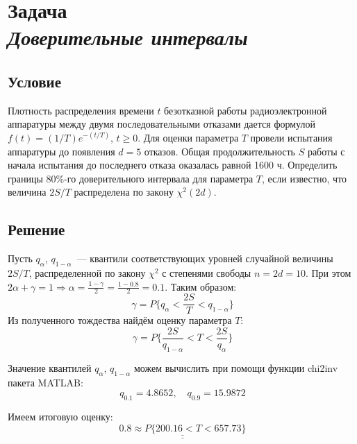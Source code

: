 \section*{Задача \\\textit{Доверительные интервалы}}

\subsection*{Условие}
\sloppy Плотность распределения времени $t$ безотказной работы радиоэлектронной аппаратуры между двумя последовательными отказами дается формулой $f(t) = (1/T)e^{-(t/T)}$, $t \geqslant 0$. Для оценки параметра $T$ провели испытания аппаратуры до появления $d = 5$ отказов. Общая продолжительность $S$ работы с начала испытания до последнего отказа оказалась равной 1600 ч. Определить границы 80\%-го доверительного интервала для параметра $T$, если известно, что величина $2S/T$ распределена по закону $\chi^2(2d)$.

\subsection*{Решение}
Пусть $q_{\alpha}$, $q_{1 - \alpha}$~--- квантили соответствующих уровней случайной величины $2S/T$, распределенной по закону $\chi^2$ с степенями свободы $n = 2d = 10$. При этом $2\alpha + \gamma = 1 \Rightarrow \alpha = \frac{1 - \gamma}{2} = \frac{1 - 0.8}{2} = 0.1$. Таким образом:
\begin{equation*}
    \gamma = P\Big\{q_{\alpha} < \frac{2S}{T} < q_{1 - \alpha}\Big\}
\end{equation*}
Из полученного тождества найдём оценку параметра $T$:
\begin{equation*}
    \gamma = P\Big\{\frac{2S}{q_{1 - \alpha}} < T < \frac{2S}{q_{\alpha}}\Big\}
\end{equation*}

Значение квантилей $q_{\alpha}$, $q_{1 - \alpha}$ можем вычислить при помощи функции chi2inv пакета MATLAB\@:
\begin{equation*}
    q_{0.1} = 4.8652,\quad q_{0.9} = 15.9872
\end{equation*}

Имеем итоговую оценку:
\begin{equation*}
    \underline{\underline{0.8 \approx P\Big\{200.16 < T < 657.73\Big\}}}
\end{equation*}

